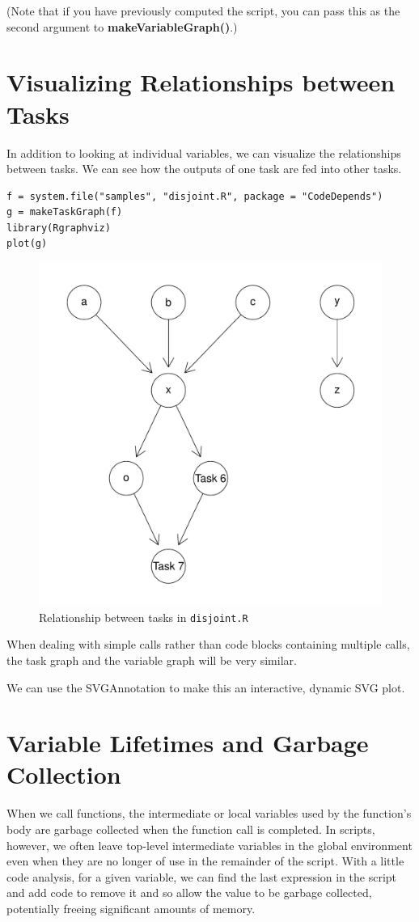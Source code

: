 \documentclass{article}
\def\Rfunc#1{\textbf{#1()}}
\begin{document}
(Note that if you have previously computed the script, you can pass this
as the second argument to \Rfunc{makeVariableGraph}.)

\section{Visualizing Relationships between Tasks}
In addition to looking at individual variables, we
can visualize the relationships between tasks.
We can see how the outputs of one task are fed into 
other tasks. 
\begin{verbatim}
f = system.file("samples", "disjoint.R", package = "CodeDepends")
g = makeTaskGraph(f)
library(Rgraphviz)
plot(g)
\end{verbatim}
\begin{figure}
  \centering
  \includegraphics{taskGraph.pdf}
  \caption{Relationship between tasks in \texttt{disjoint.R}}
\end{figure}

When dealing with simple calls rather than 
code blocks containing multiple calls, the task graph
and the variable graph will be very similar.

We can use the SVGAnnotation to make this an interactive,
dynamic SVG plot.


\section{Variable Lifetimes and Garbage Collection}
When we call  functions, the intermediate or local variables
used by the function's body are garbage collected when the function
call is completed. In scripts, however, we often leave top-level intermediate
variables in the global environment even when they are no longer of
use in the remainder of the script.
With a little code analysis, for a given variable,
we can find the last expression in the script and 
add code to remove it and so allow the value to be garbage collected,
potentially freeing significant amounts of memory.
\end{document}
